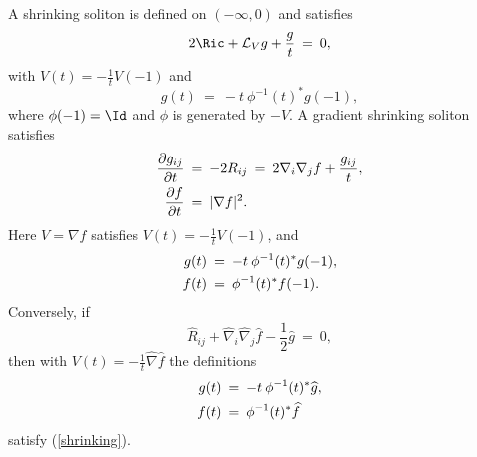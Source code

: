 A shrinking soliton is defined on $(-\infty,0)$ and satisfies
\begin{equation}
2\Ric+{\mathcal L}_Vg+\frac gt\:=\:0,
\end{equation}
with $V(t)=-\frac1tV(-1)$ and
\begin{equation} \label{shrinkingflow}
g(t)\:=\:-t\:\phi^{-1}(t)^*g(-1),
\end{equation}
where $\phi(-1)=\Id$ and $\phi$ is generated by $-V$.
A gradient shrinking soliton satisfies
\begin{align} \label{shrinking}
\frac{\partial g_{ij}}{\partial t}\: & = \:-2R_{ij}\:=\:
2\nabla_i\nabla_jf+\frac{g_{ij}}t,\\
\frac{\partial f}{\partial t}\: & = \:|\nabla f|^2. \notag
\end{align}
Here $V=\nabla f$ satisfies $V(t)=-\frac1tV(-1)$, and
\begin{align} \label{shrinkingsoln}
g(t)\: & = \:-t\:\phi^{-1}(t)^*g(-1),\\
f(t)\: & = \:\phi^{-1}(t)^*f(-1). \notag
\end{align}
Conversely, if
\begin{equation}
\widehat R_{ij}+\widehat\nabla_i\widehat\nabla_j\widehat f
-\frac12\widehat g\:=\:0,
\end{equation}
then with $V(t)=-\frac1t\widehat\nabla\widehat f$ the definitions
\begin{align}
g(t)\: & = \:-t\:\phi^{-1}(t)^*\widehat g,\\
f(t)\: & = \:\phi^{-1}(t)^*\widehat f \notag
\end{align}
satisfy (\ref{shrinking}).


